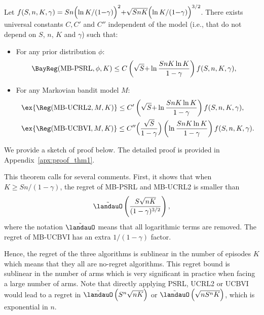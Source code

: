 \begin{thm}
    \label{thm:regret_upper_bound}
    Let $f(S,n,K,\gamma)=Sn\Bigl(\ln K/(1{-}\gamma)\Bigr)^{2}{+} \sqrt{SnK}\Bigl(\ln K/(1{-}\gamma)\Bigr)^{3/2}$. There exists universal constants $C, C'$ and $C''$ independent of the model (i.e., that do not depend on $S$, $n$, $K$ and $\gamma$) such that:
    \begin{itemize}
        \item For any prior distribution $\phi$:
        \begin{align*}
            \BayReg(\textnormal{MB-PSRL},\phi,K) &\le C\left(\sqrt{S} {+}\ln\frac{SnK\ln K}{1-\gamma}\right) f(S,n,K,\gamma),
        \end{align*}
        \item For any Markovian bandit model $M$:
    \begin{align*}
        &\ex{\Reg(\textnormal{MB-UCRL2},M,K)} \le C'\left(\sqrt{S} {+}\ln\frac{SnK\ln K}{1-\gamma}\right) f(S,n,K,\gamma),\\
        &\ex{\Reg(\textnormal{MB-UCBVI},M,K)} \le C''\Bigl(\frac{\sqrt{S}}{1-\gamma}\Bigr)\left(\ln\frac{SnK\ln K}{1-\gamma}\right) f(S,n,K,\gamma).
    \end{align*}
    \end{itemize}
\end{thm}

We provide a sketch of proof below. The detailed proof is provided in Appendix~\ref{apx:proof_thm1}.

This theorem calls for several comments. First, it shows that when $K\ge Sn/(1-\gamma)$, the regret of MB-PSRL and MB-UCRL2 is smaller than 
\begin{equation}
    \label{eq:regret_tilde}
    \tilde{\landauO}\left(\frac{S\sqrt{nK}}{(1-\gamma)^{3/2}}\right),
\end{equation}
where the notation $\tilde{\landauO}$ means that all logarithmic terms are removed. The regret of MB-UCBVI has an extra $1/(1-\gamma)$ factor. 

Hence, the regret of the three algorithms is sublinear in the number of episodes $K$ which means that they all are no-regret algorithms. This regret bound is sublinear in the number of arms which is very significant in practice when facing a large number of arms. Note that directly applying PSRL, UCRL2 or UCBVI would lead to a regret in  $\tilde{\landauO}\left(S^n\sqrt{nK}\right)$ or $\tilde{\landauO}\left(\sqrt{nS^nK}\right)$, which is exponential in $n$.


